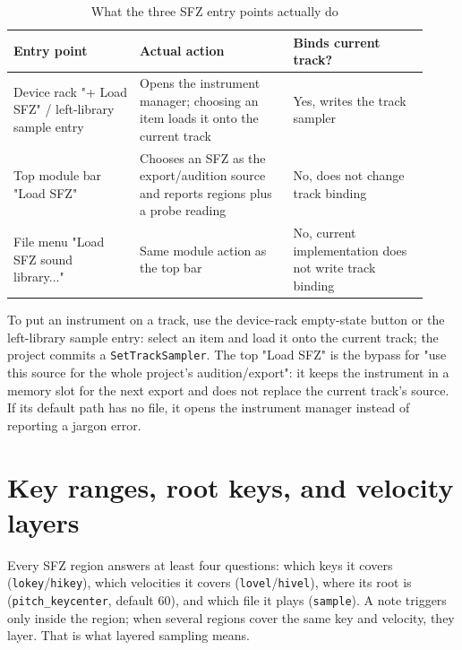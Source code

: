 \begin{table}[htbp]
\centering
\small
\begin{tabular}{@{}p{0.28\linewidth}p{0.34\linewidth}p{0.30\linewidth}@{}}
\hline
Entry point & Actual action & Binds current track? \\
\hline
Device rack "+ Load SFZ" / left-library sample entry & Opens the instrument manager; choosing an item loads it onto the current track & Yes, writes the track sampler \\
Top module bar "Load SFZ" & Chooses an SFZ as the export/audition source and reports regions plus a probe reading & No, does not change track binding \\
File menu "Load SFZ sound library..." & Same module action as the top bar & No, current implementation does not write track binding \\
\hline
\end{tabular}
\caption{What the three SFZ entry points actually do}
\label{tab:sfz-entry}
\end{table}

To put an instrument on a track, use the device-rack empty-state button or the left-library sample entry: select an item and load it onto the current track; the project commits a \texttt{SetTrackSampler}. The top "Load SFZ" is the bypass for "use this source for the whole project's audition/export": it keeps the instrument in a memory slot for the next export and does not replace the current track's source. If its default path has no file, it opens the instrument manager instead of reporting a jargon error.

\section{Key ranges, root keys, and velocity layers}

Every SFZ region answers at least four questions: which keys it covers (\texttt{lokey}/\texttt{hikey}), which velocities it covers (\texttt{lovel}/\texttt{hivel}), where its root is (\texttt{pitch\_keycenter}, default 60), and which file it plays (\texttt{sample}). A note triggers only inside the region; when several regions cover the same key and velocity, they layer. That is what layered sampling means.

